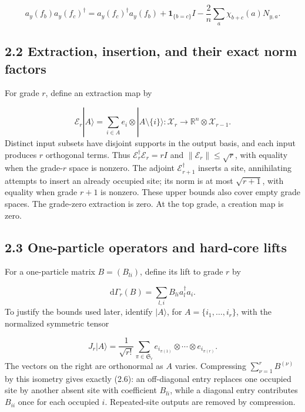 \documentclass[11pt,a4paper]{article}
\begin{document}
\begin{equation}
a_y(f_b)a_y(f_c)^\dagger
=a_y(f_c)^\dagger a_y(f_b)
+\mathbf1_{\{b=c\}}I-\frac2n\sum_a\chi_{b+c}(a)N_{y,a}.
\tag{2.4}
\end{equation}
\subsection*{2.2 Extraction, insertion, and their exact norm factors}
For grade \(r\), define an extraction map by

\begin{equation}
\mathcal E_r|A\rangle=\sum_{i\in A}e_i\otimes|A\setminus\{i\}\rangle
:\mathcal X_r\longrightarrow\mathbb R^n\otimes\mathcal X_{r-1}.
\tag{2.5}
\end{equation}
Distinct input subsets have disjoint supports in the output basis, and each input produces \(r\) orthogonal terms. Thus \(\mathcal E_r^\dagger\mathcal E_r=rI\) and \(\|\mathcal E_r\|\le\sqrt r\), with equality when the grade-\(r\) space is nonzero. The adjoint \(\mathcal E_{r+1}^\dagger\) inserts a site, annihilating attempts to insert an already occupied site; its norm is at most \(\sqrt{r+1}\), with equality when grade \(r+1\) is nonzero. These upper bounds also cover empty grade spaces. The grade-zero extraction is zero. At the top grade, a creation map is zero.

\subsection*{2.3 One-particle operators and hard-core lifts}
For a one-particle matrix \(B=(B_{li})\), define its lift to grade \(r\) by

\begin{equation}
\mathrm d\Gamma_r(B)=\sum_{l,i}B_{li}a_l^\dagger a_i .
\tag{2.6}
\end{equation}
To justify the bounds used later, identify \(|A\rangle\), for \(A=\{i_1,\ldots,i_r\}\), with the normalized symmetric tensor

\begin{equation}
J_r|A\rangle=
\frac1{\sqrt{r!}}\sum_{\pi\in\mathfrak S_r}
e_{i_{\pi(1)}}\otimes\cdots\otimes e_{i_{\pi(r)}}.
\tag{2.7}
\end{equation}
The vectors on the right are orthonormal as \(A\) varies. Compressing \(\sum_{\nu=1}^r B^{(\nu)}\) by this isometry gives exactly (2.6): an off-diagonal entry replaces one occupied site by another absent site with coefficient \(B_{li}\), while a diagonal entry contributes \(B_{ii}\) once for each occupied \(i\). Repeated-site outputs are removed by compression.
\end{document}
